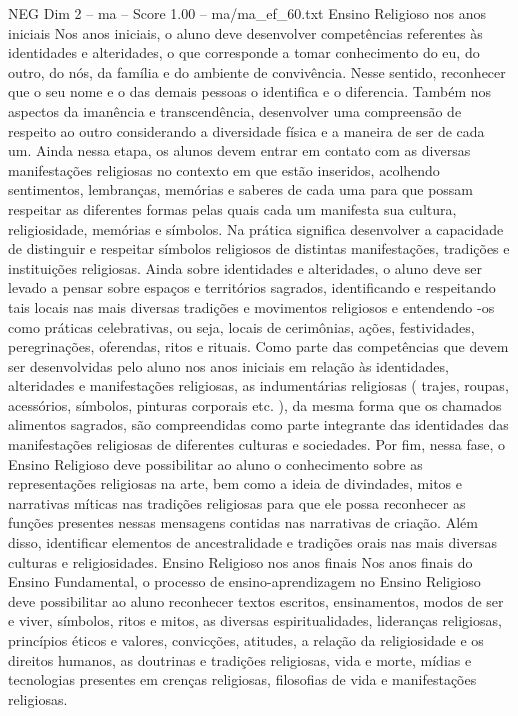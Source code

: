 \begin{textsample}{NEG Dim 2 – ma – Score 1.00 – ma/ma\_ef\_60.txt}  \label{ex:f2_neg_235}
Ensino Religioso nos anos iniciais Nos anos iniciais, o aluno deve desenvolver competências referentes às identidades e alteridades, o que corresponde a tomar conhecimento do eu, do outro, do nós, da família e do ambiente de convivência.
Nesse sentido, reconhecer que o seu nome e o das demais pessoas o identifica e o diferencia.
Também nos aspectos da imanência e transcendência, desenvolver uma compreensão de respeito ao outro considerando a diversidade física e a maneira de ser de cada um.
Ainda nessa etapa, os alunos devem entrar em contato com as diversas manifestações religiosas no contexto em que estão inseridos, acolhendo sentimentos, lembranças, memórias e saberes de cada uma para que possam respeitar as diferentes formas pelas quais cada um manifesta sua cultura, religiosidade, memórias e símbolos.
Na prática significa desenvolver a capacidade de distinguir e respeitar símbolos religiosos de distintas manifestações, tradições e instituições religiosas.
Ainda sobre identidades e alteridades, o aluno deve ser levado a pensar sobre espaços e territórios sagrados, identificando e respeitando tais locais nas mais diversas tradições e movimentos religiosos e entendendo -os como práticas celebrativas, ou seja, locais de cerimônias, ações, festividades, peregrinações, oferendas, ritos e rituais.
Como parte das competências que devem ser desenvolvidas pelo aluno nos anos iniciais em relação às identidades, alteridades e manifestações religiosas, as indumentárias religiosas ( trajes, roupas, acessórios, símbolos, pinturas corporais etc. ), da mesma forma que os chamados alimentos sagrados, são compreendidas como parte integrante das identidades das manifestações religiosas de diferentes culturas e sociedades.
Por fim, nessa fase, o Ensino Religioso deve possibilitar ao aluno o conhecimento sobre as representações religiosas na arte, bem como a ideia de divindades, mitos e narrativas míticas nas tradições religiosas para que ele possa reconhecer as funções presentes nessas mensagens contidas nas narrativas de criação.
Além disso, identificar elementos de ancestralidade e tradições orais nas mais diversas culturas e religiosidades.
Ensino Religioso nos anos finais Nos anos finais do Ensino Fundamental, o processo de ensino-aprendizagem no Ensino Religioso deve possibilitar ao aluno reconhecer textos escritos, ensinamentos, modos de ser e viver, símbolos, ritos e mitos, as diversas espiritualidades, lideranças religiosas, princípios éticos e valores, convicções, atitudes, a relação da religiosidade e os direitos humanos, as doutrinas e tradições religiosas, vida e morte, mídias e tecnologias presentes em crenças religiosas, filosofias de vida e manifestações religiosas.

\end{textsample}
